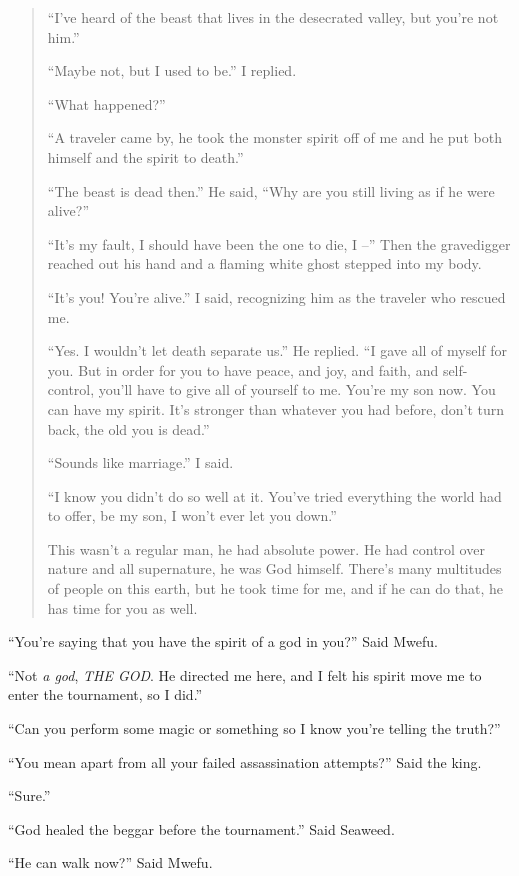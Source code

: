 \begin{quote}
``I've heard of the beast that lives in the desecrated valley, but you're not him.''

``Maybe not, but I used to be.'' I replied.

``What happened?''

``A traveler came by, he took the monster spirit off of me and he put both himself and the spirit to death.''

``The beast is dead then.'' He said, ``Why are you still living as if he were alive?''

``It's my fault, I should have been the one to die, I --'' Then the gravedigger reached out his hand and a flaming white ghost stepped into my body.

``It's you! You're alive.'' I said, recognizing him as the traveler who rescued me.

``Yes. I wouldn't let death separate us.'' He replied. ``I gave all of myself for you. But in order for you to have peace, and joy, and faith, and self-control, you'll have to give all of yourself to me. You're my son now. You can have my spirit. It's stronger than whatever you had before, don't turn back, the old you is dead.''

``Sounds like marriage.'' I said.

``I know you didn't do so well at it. You've tried everything the world had to offer, be my son, I won't ever let you down.''

This wasn't a regular man, he had absolute power. He had control over nature and all supernature, he was God himself. There's many multitudes of people on this earth, but he took time for me, and if he can do that, he has time for you as well.

\end{quote}

``You're saying that you have the spirit of a god in you?'' Said Mwefu.

``Not \emph{a god}, \emph{THE GOD}. He directed me here, and I felt his spirit move me to enter the tournament, so I did.''

``Can you perform some magic or something so I know you're telling the truth?''

``You mean apart from all your failed assassination attempts?'' Said the king.

``Sure.''

``God healed the beggar before the tournament.'' Said Seaweed.

``He can walk now?'' Said Mwefu.

